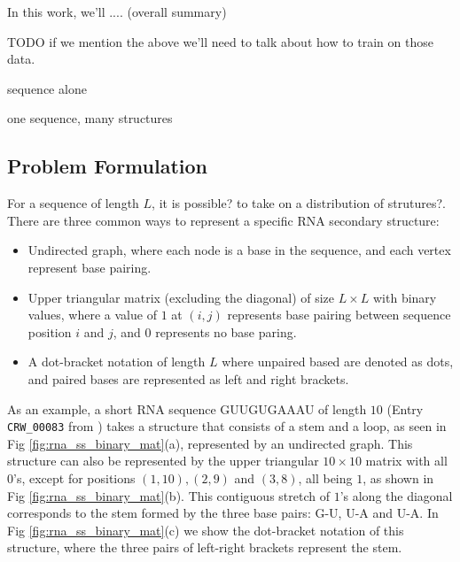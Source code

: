 \documentclass{article}
\begin{document}
In this work, we'll .... (overall summary)

TODO if we mention the above we'll need to talk about how to train on those data.

sequence alone

one sequence, many structures

\subsection{Problem Formulation}

For a sequence of length $L$, it is possible? to take on a distribution of strutures?.
There are three common ways to represent a specific RNA secondary structure:

\begin{itemize}

    \item Undirected graph, where each node is a base in the sequence, and each vertex represent base pairing.

    \item Upper triangular matrix (excluding the diagonal)
of size $L \times L$ with binary values, where a value of $1$ at $(i, j)$ represents
base pairing between sequence position $i$ and $j$, and $0$ represents no base paring.

    \item A dot-bracket notation of length $L$ where unpaired based are denoted as dots,
    and paired bases are represented as left and right brackets.

\end{itemize}

As an example, a short RNA sequence GUUGUGAAAU of length $10$ (Entry \verb|CRW_00083| from \cite{andronescu2008rna}) takes a structure that
consists of a stem and a loop, as seen in Fig \ref{fig:rna_ss_binary_mat}(a), represented by an undirected graph.
This structure can also be represented by the upper triangular $10 \times 10$ matrix with all $0$'s,
except for positions
$(1, 10), (2, 9)$ and $(3, 8)$,
all being $1$, as shown in Fig \ref{fig:rna_ss_binary_mat}(b).
This contiguous stretch of $1$'s along the diagonal corresponds to the stem formed by the three base pairs: G-U, U-A and U-A.
In Fig \ref{fig:rna_ss_binary_mat}(c) we show the dot-bracket notation of this structure, where the three pairs
of left-right brackets represent the stem.
\end{document}
